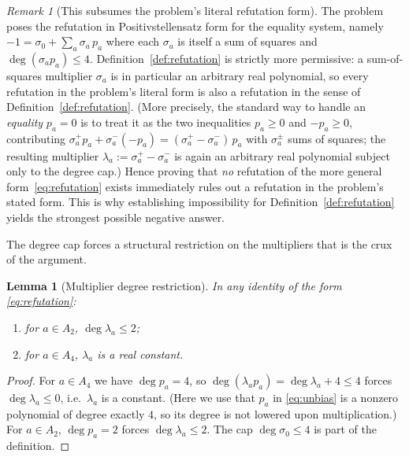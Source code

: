 \documentclass{amsart}
\newtheorem{lemma}{Lemma}
\theoremstyle{definition}
\theoremstyle{remark}
\newtheorem{remark}{Remark}
\begin{document}
\begin{remark}[This subsumes the problem's literal refutation form]\label{rem:subsume}
The problem poses the refutation in Positivstellensatz form for the equality system, namely
$-1=\sigma_0+\sum_a \sigma_a\,p_a$ where each $\sigma_a$ is itself a sum of squares and
$\deg(\sigma_a p_a)\le4$. Definition~\ref{def:refutation} is strictly more permissive: a
sum-of-squares multiplier $\sigma_a$ is in particular an arbitrary real polynomial, so every
refutation in the problem's literal form is also a refutation in the sense of
Definition~\ref{def:refutation}. (More precisely, the standard way to handle an
\emph{equality} $p_a=0$ is to treat it as the two inequalities $p_a\ge0$ and $-p_a\ge0$,
contributing $\sigma_a^{+}p_a+\sigma_a^{-}(-p_a)=(\sigma_a^{+}-\sigma_a^{-})\,p_a$ with
$\sigma_a^{\pm}$ sums of squares; the resulting multiplier
$\lambda_a:=\sigma_a^{+}-\sigma_a^{-}$ is again an arbitrary real polynomial subject only to
the degree cap.) Hence proving that \emph{no} refutation of the more general
form~\eqref{eq:refutation} exists immediately rules out a refutation in the problem's stated
form. This is why establishing impossibility for Definition~\ref{def:refutation} yields the
strongest possible negative answer.
\end{remark}

The degree cap forces a structural restriction on the multipliers that is the crux of the
argument.

\begin{lemma}[Multiplier degree restriction]\label{lem:multdeg}
In any identity of the form \eqref{eq:refutation}:
\begin{enumerate}
\item for $a\in A_2$, $\deg\lambda_a\le 2$;
\item for $a\in A_4$, $\lambda_a$ is a real constant.
\end{enumerate}
\end{lemma}

\begin{proof}
For $a\in A_4$ we have $\deg p_a=4$, so $\deg(\lambda_a p_a)=\deg\lambda_a+4\le 4$ forces
$\deg\lambda_a\le 0$, i.e.\ $\lambda_a$ is a constant. (Here we use that $p_a$ in
\eqref{eq:unbias} is a nonzero polynomial of degree exactly $4$, so its degree is not lowered
upon multiplication.) For $a\in A_2$, $\deg p_a=2$ forces $\deg\lambda_a\le2$. The cap
$\deg\sigma_0\le 4$ is part of the definition. \qedhere
\end{proof}
\end{document}
